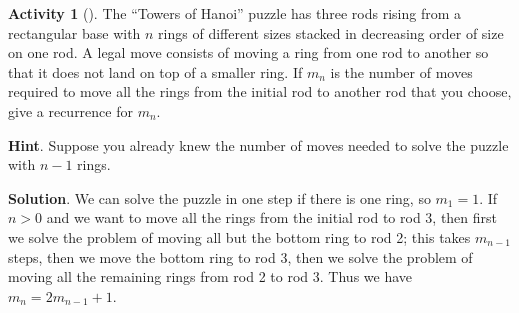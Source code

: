 \documentclass[10pt,]{book}
\theoremstyle{plain}
\theoremstyle{definition}
\theoremstyle{definition}
\theoremstyle{definition}
\newtheorem{activity}[project]{Activity}
\theoremstyle{definition}
\numberwithin{equation}{chapter}
\begin{document}
\begin{activity}[]\label{HanoiProblem}
\hypertarget{p-804}{}%
The ``Towers of Hanoi'' puzzle has three rods rising from a rectangular base with \(n\) rings of different sizes stacked in decreasing order of size on one rod. A legal move consists of moving a ring from one rod to another so that it does not land on top of a smaller ring. If \(m_n\) is the number of moves required to move all the rings from the initial rod to another rod that you choose, give a recurrence for \(m_n\).%
\par\smallskip%
\noindent\textbf{Hint}.\hypertarget{hint-72}{}\quad%
\hypertarget{p-805}{}%
Suppose you already knew the number of moves needed to solve the puzzle with \(n-1\) rings.%
\par\smallskip%
\noindent\textbf{Solution}.\hypertarget{solution-76}{}\quad%
\hypertarget{p-806}{}%
We can solve the puzzle in one step if there is one ring, so \(m_1=1\). If \(n>0\) and we want to move all the rings from the initial rod to rod 3, then first we solve the problem of moving all but the bottom ring to rod 2; this takes \(m_{n-1}\) steps, then we move the bottom ring to rod 3, then we solve the problem of moving all the remaining rings from rod 2 to rod 3. Thus we have \(m_n=2m_{n-1}+1\).%
\end{activity}
\end{document}
